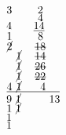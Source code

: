 \begin{minipage}[t]{0.33\textwidth}
\noindent
%
$\displaystyle 3 \hspace*{8,2mm} 2$\\
%
$\displaystyle\hspace*{10mm} 4$\\
%
$\displaystyle 4\hspace*{7mm} \underline{14}$\\
%
$\displaystyle 1\hspace*{8,3mm} 8$\\
%
$\displaystyle \cancel{2} \hspace*{7,3mm} \mbox{\sout{18}}$\\
%
$\displaystyle \hspace*{3mm} \cancel{1} \hspace*{4,3mm} \mbox{\sout{14}}$\\
%
$\displaystyle \hspace*{3mm} \cancel{1} \hspace*{4,3mm} \mbox{\sout{26}}$\\
%
$\displaystyle \hspace*{3mm} \cancel{1} \hspace*{4,3mm} \mbox{\sout{22}}$\\
%
$\displaystyle \underline{4 \hspace*{1.3mm} \cancel{1} \hspace*{6mm} 4 \hspace*{4,5mm}}$\\
%
$\displaystyle 9 \ \cancel{1} \hspace*{9mm}  13$\\
%
$\displaystyle 1 \ \cancel{1} $\\
%
$\displaystyle 1$\\
%
$\displaystyle 1$
%
%
\end{minipage}%

